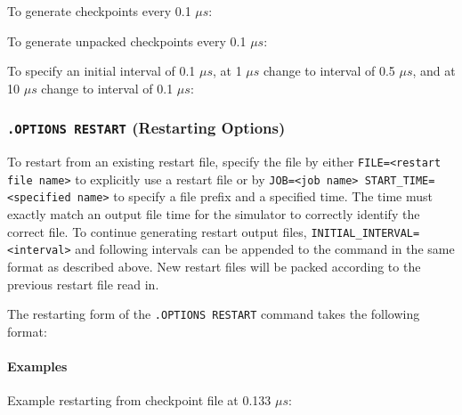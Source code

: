 
To generate checkpoints every 0.1 $\mu s$:


To generate unpacked checkpoints every 0.1 $\mu s$:


To specify an initial interval of 0.1 $\mu s$, at 1 $\mu s$ change to interval
of 0.5 $\mu s$, and at 10 $\mu s$ change to interval of 0.1 $\mu s$:


\subsubsection{\texttt{.OPTIONS RESTART} (Restarting Options)}

To restart from an existing restart file, specify the file
by either \texttt{FILE=<restart file name>} to explicitly use a restart file or
by \texttt{JOB=<job name> START\_TIME=<specified name>} to specify a file
prefix and a specified time.  The time must exactly match an output file time
for the simulator to correctly identify the correct file.  To continue
generating restart output files, \texttt{INITIAL\_INTERVAL=<interval>} and
following intervals can be appended to the command in the same format as
described above.  New restart files will be packed according to the previous
restart file read in.  

The restarting form of the \texttt{.OPTIONS RESTART} command takes the following format:


\paragraph{Examples}

Example restarting from checkpoint file at 0.133 $\mu s$:

